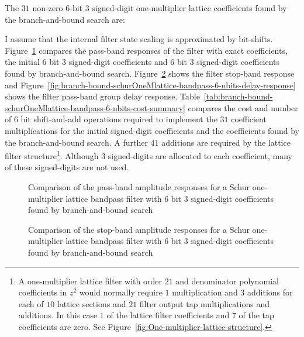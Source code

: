 \documentclass[a4paper,twoside,10pt,english]{report}
\begin{document}
The $31$ non-zero 6-bit 3 signed-digit one-multiplier lattice coefficients 
found by the branch-and-bound search are:
\begin{small}


\end{small}
I assume that the internal filter state scaling is approximated by bit-shifts.
Figure~\ref{fig:branch-bound-schurOneMlattice-bandpass-6-nbits-pass-response}
compares the pass-band responses of the filter with exact coefficients, the 
initial 6 bit 3 signed-digit coefficients and 6 bit 3 signed-digit 
coefficients found by branch-and-bound search.
Figure~\ref{fig:branch-bound-schurOneMlattice-bandpass-6-nbits-stop-response}
shows the filter stop-band response and
Figure~\ref{fig:branch-bound-schurOneMlattice-bandpass-6-nbits-delay-response}
shows the filter pass-band group delay response.
Table~\ref{tab:branch-bound-schurOneMlattice-bandpass-6-nbits-cost-summary} 
compares the cost and number of $6$ bit shift-and-add operations required to
implement the $31$ coefficient multiplications for the initial signed-digit 
coefficients and the coefficients found by the branch-and-bound search. A 
further $41$ additions are required by the lattice filter 
structure\footnote{A one-multiplier lattice filter with order $21$ and 
denominator polynomial coefficients in $z^{2}$ would normally require $1$ 
multiplication and $3$ additions for each of $10$ lattice sections and $21$ 
filter output tap multiplications and additions. In this case $1$ of the lattice
filter coefficients and $7$ of the tap coefficients are zero. See 
Figure~\ref{fig:One-multiplier-lattice-structure}.}.
Although $3$ signed-digits are allocated to each coefficient, many of these 
signed-digits are not used.
\begin{figure}[!htbp]
\begin{center}
\scalebox{0.7}{}
\caption{Comparison of the pass-band amplitude responses for a Schur
  one-multiplier lattice bandpass filter with 6 bit 3 signed-digit
  coefficients found by branch-and-bound search}
\label{fig:branch-bound-schurOneMlattice-bandpass-6-nbits-pass-response}
\end{center}
\end{figure}
\begin{figure}[!htbp]
\begin{center}
\scalebox{0.7}{}
\caption{Comparison of the stop-band amplitude responses for a Schur
  one-multiplier lattice bandpass filter with 6 bit 3 signed-digit 
  coefficients found by branch-and-bound search}
\label{fig:branch-bound-schurOneMlattice-bandpass-6-nbits-stop-response}
\end{center}
\end{figure}
\end{document}
